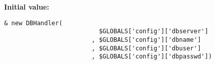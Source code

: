 \textbf{Initial value:}

\begin{Code}\begin{verbatim}& new DBHandler(
                          $GLOBALS['config']['dbserver']
                        , $GLOBALS['config']['dbname']
                        , $GLOBALS['config']['dbuser']
                        , $GLOBALS['config']['dbpasswd'])
\end{verbatim}
\end{Code}
